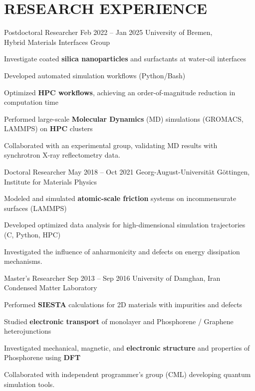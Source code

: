 \section{RESEARCH EXPERIENCE}

\cvexperince
  {Postdoctoral Researcher}
  {Feb 2022 -- Jan 2025}
  {University of Bremen,\\
  Hybrid Materials Interfaces Group}
  {
    \item Investigate coated \textbf{silica nanoparticles} and surfactants at water-oil interfaces
    \item Developed automated simulation workflows (Python/Bash)
    \item Optimized \textbf{HPC workflows}, achieving an order-of-magnitude reduction in computation time
    \item Performed large-scale \textbf{Molecular Dynamics} (MD) simulations (GROMACS, LAMMPS) on \textbf{HPC} clusters
    \item Collaborated with an experimental group, validating MD results with synchrotron X-ray reflectometry data.
    \item%
  }

\cvexperince
  {Doctoral Researcher}
  {May 2018 -- Oct 2021}
  {Georg-August-Universität Göttingen,\\
  Institute for Materials Physics}
  {
    \item Modeled and simulated \textbf{atomic-scale friction} systems on incommensurate surfaces (LAMMPS)
    \item Developed optimized data analysis for high-dimensional simulation trajectories (C, Python, HPC)
    \item Investigated the influence of anharmonicity and defects on energy dissipation mechanisms.
    \item%
  }

\cvexperince
  {Master's Researcher}
  {Sep 2013 -- Sep 2016}
  {University of Damghan, Iran\\
  Condensed Matter Laboratory}
  {
    \item Performed \textbf{SIESTA} calculations for 2D materials with impurities and defects
    \item Studied \textbf{electronic transport} of monolayer and Phosphorene / Graphene heterojunctions
    \item Investigated mechanical, magnetic, and \textbf{electronic structure} and properties of Phosphorene using \textbf{DFT}
    \item Collaborated with independent programmer's group (CML) developing quantum simulation tools.
    \item%
  }
  

